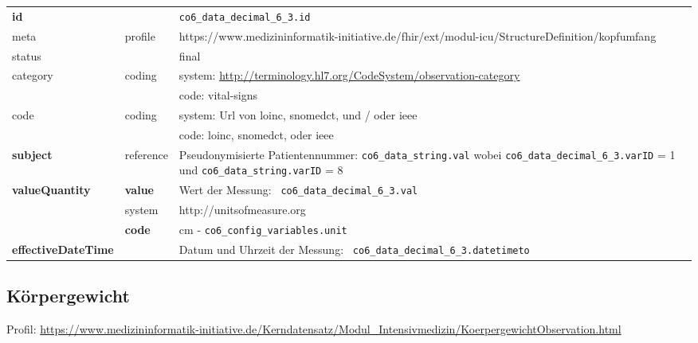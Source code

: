 \begin{longtable}{|l|l|p{7.5cm}|}
	\hline
	\rowcolor{lightgray} \multicolumn{3}{|l|}{Data Mapping (inhaltlich)} \\ \hline
	\textbf{id} &  & \texttt{co6\_data\_decimal\_6\_3.id} \\ \hline
	meta & profile & https://www.medizininformatik-initiative.de/fhir/ext/modul-icu/StructureDefinition/kopfumfang \\ \hline 
	status &  & final   \\ \hline 
	category & coding & system: \url{http://terminology.hl7.org/CodeSystem/observation-category} \\
	\cline{3-3}
	& & code: vital-signs \\ \hline
	code & coding & system: Url von \ac{loinc}, \ac{snomedct}, und / oder \ac{ieee} \\ 
	\cline{3-3} 
	&  & code: \ac{loinc}, \ac{snomedct}, oder \ac{ieee} \\ \hline
	\textbf{subject} & reference & Pseudonymisierte Patientennummer: \texttt{co6\_data\_string.val} wobei \texttt{co6\_data\_decimal\_6\_3.varID} = 1 und \texttt{co6\_data\_string.varID} = 8 \\ \hline
	\textbf{valueQuantity}  & \textbf{value} & Wert der Messung: \texttt{
		co6\_data\_decimal\_6\_3.val} \\
	\cline{2-3}
	& system & http://unitsofmeasure.org \\
	\cline{2-3}
	& \textbf{code} & cm - \texttt{co6\_config\_variables.unit} \\ \hline
	\textbf{effectiveDateTime}  & & Datum und Uhrzeit der Messung: \texttt{
		co6\_data\_decimal\_6\_3.datetimeto} \\ \hline
\end{longtable}

\subsection{Körpergewicht} 

Profil: \url{https://www.medizininformatik-initiative.de/Kerndatensatz/Modul_Intensivmedizin/KoerpergewichtObservation.html}

